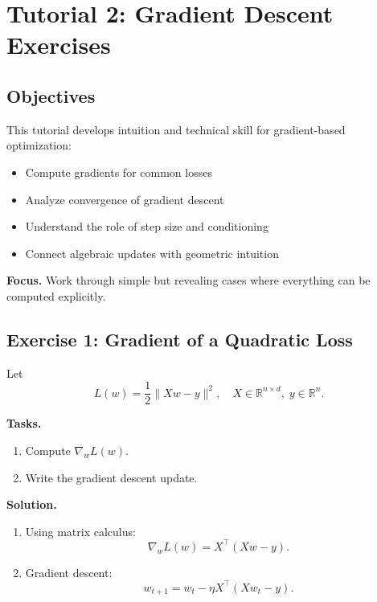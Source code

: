\section{Tutorial 2: Gradient Descent Exercises}

\subsection{Objectives}

This tutorial develops intuition and technical skill for gradient-based optimization:
\begin{itemize}
    \item Compute gradients for common losses
    \item Analyze convergence of gradient descent
    \item Understand the role of step size and conditioning
    \item Connect algebraic updates with geometric intuition
\end{itemize}

\medskip

\noindent
\textbf{Focus.}  
Work through simple but revealing cases where everything can be computed explicitly.

\subsection{Exercise 1: Gradient of a Quadratic Loss}

Let
\[
L(w) = \frac{1}{2}\|Xw - y\|^2, \quad X \in \mathbb{R}^{n \times d}, \; y \in \mathbb{R}^n.
\]

\medskip

\noindent
\textbf{Tasks.}
\begin{enumerate}
    \item Compute $\nabla_w L(w)$.
    \item Write the gradient descent update.
\end{enumerate}

\medskip

\noindent
\textbf{Solution.}

\begin{enumerate}
\item Using matrix calculus:
\[
\nabla_w L(w) = X^\top (Xw - y).
\]

\item Gradient descent:
\[
w_{t+1} = w_t - \eta X^\top (Xw_t - y).
\]
\end{enumerate}

